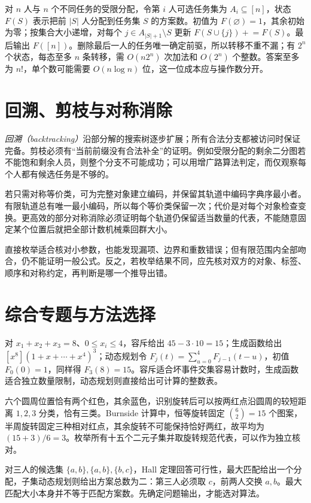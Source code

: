 对 $n$ 人与 $n$ 个不同任务的受限分配，令第 $i$ 人可选任务集为 $A_i\subseteq[n]$，状态 $F(S)$ 表示把前 $|S|$ 人分配到任务集 $S$ 的方案数。初值为 $F(\varnothing)=1$，其余初始为零；按集合大小递增，对每个 $j\in A_{|S|+1}\setminus S$ 更新 $F(S\cup\{j\})\mathrel{+}=F(S)$。最后输出 $F([n])$。删除最后一人的任务唯一确定前驱，所以转移不重不漏；有 $2^n$ 个状态，每态至多 $n$ 条转移，需 $O(n2^n)$ 次加法和 $O(2^n)$ 个整数。答案至多为 $n!$，单个数可能需要 $O(n\log n)$ 位，这一位成本应与操作数分开。

\section{回溯、剪枝与对称消除}

\emph{回溯（backtracking）}沿部分解的搜索树逐步扩展；所有合法分支都被访问时保证完备。剪枝必须有“当前前缀没有合法补全”的证明。例如受限分配的剩余二分图若不能饱和剩余人员，则整个分支不可能成功；可以用增广路算法判定，而仅观察每个人都有候选任务是不够的。

若只需对称等价类，可为完整对象建立编码，并保留其轨道中编码字典序最小者。有限轨道总有唯一最小编码，所以每个等价类保留一次；代价是对每个对象检查变换。更高效的部分对称消除必须证明每个轨道仍保留适当数量的代表，不能随意固定某个位置后就把全部计数机械乘回群大小。

直接枚举适合核对小参数，也能发现漏项、边界和重数错误；但有限范围内全部吻合，仍不能证明一般公式。反之，若枚举结果不同，应先核对双方的对象、标签、顺序和对称约定，再判断是哪一个推导出错。

\section{综合专题与方法选择}

对 $x_1+x_2+x_3=8$、$0\le x_i\le4$，容斥给出 $45-3\cdot10=15$；生成函数给出 $[x^8](1+x+\cdots+x^4)^3$；动态规划令 $F_j(t)=\sum_{u=0}^4F_{j-1}(t-u)$，初值 $F_0(0)=1$，同样得 $F_3(8)=15$。容斥适合坏事件交集容易计数时，生成函数适合独立数量限制，动态规划则直接给出可计算的整数表。

六个圆周位置恰有两个红色，其余蓝色，识别旋转后可以按两红点沿圆周的较短距离 $1,2,3$ 分类，恰有三类。Burnside 计算中，恒等旋转固定 $\binom62=15$ 个图案，半周旋转固定三种相对红点，其余旋转不可能保持恰好两红，故平均为 $(15+3)/6=3$。枚举所有十五个二元子集并取旋转规范代表，可以作为独立核对。

对三人的候选集 $\{a,b\},\{a,b\},\{b,c\}$，Hall 定理回答可行性，最大匹配给出一个分配，子集动态规划则给出方案总数为二：第三人必须取 $c$，前两人交换 $a,b$。最大匹配大小本身并不等于匹配方案数。先确定问题输出，才能选对算法。

